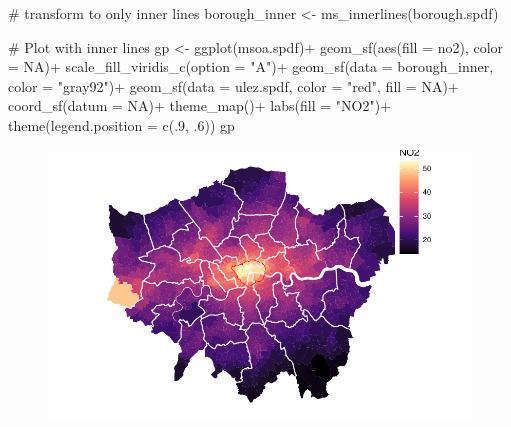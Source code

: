 \documentclass[
  letterpaper,
  DIV=11,
  numbers=noendperiod]{scrreprt}
\newenvironment{Shaded}{\begin{snugshade}}{\end{snugshade}}
\newcommand{\AttributeTok}[1]{\textcolor[rgb]{0.40,0.45,0.13}{#1}}
\newcommand{\CommentTok}[1]{\textcolor[rgb]{0.37,0.37,0.37}{#1}}
\newcommand{\ConstantTok}[1]{\textcolor[rgb]{0.56,0.35,0.01}{#1}}
\newcommand{\DecValTok}[1]{\textcolor[rgb]{0.68,0.00,0.00}{#1}}
\newcommand{\FunctionTok}[1]{\textcolor[rgb]{0.28,0.35,0.67}{#1}}
\newcommand{\NormalTok}[1]{\textcolor[rgb]{0.00,0.23,0.31}{#1}}
\newcommand{\OtherTok}[1]{\textcolor[rgb]{0.00,0.23,0.31}{#1}}
\newcommand{\SpecialCharTok}[1]{\textcolor[rgb]{0.37,0.37,0.37}{#1}}
\newcommand{\StringTok}[1]{\textcolor[rgb]{0.13,0.47,0.30}{#1}}
\begin{document}
\begin{Shaded}
\begin{Highlighting}[]
\CommentTok{\# transform to only inner lines}
\NormalTok{borough\_inner }\OtherTok{\textless{}{-}} \FunctionTok{ms\_innerlines}\NormalTok{(borough.spdf)}

\CommentTok{\# Plot with inner lines}
\NormalTok{gp }\OtherTok{\textless{}{-}} \FunctionTok{ggplot}\NormalTok{(msoa.spdf)}\SpecialCharTok{+}
    \FunctionTok{geom\_sf}\NormalTok{(}\FunctionTok{aes}\NormalTok{(}\AttributeTok{fill =}\NormalTok{ no2), }\AttributeTok{color =} \ConstantTok{NA}\NormalTok{)}\SpecialCharTok{+}
    \FunctionTok{scale\_fill\_viridis\_c}\NormalTok{(}\AttributeTok{option =} \StringTok{"A"}\NormalTok{)}\SpecialCharTok{+}
    \FunctionTok{geom\_sf}\NormalTok{(}\AttributeTok{data =}\NormalTok{ borough\_inner, }\AttributeTok{color =} \StringTok{"gray92"}\NormalTok{)}\SpecialCharTok{+}
    \FunctionTok{geom\_sf}\NormalTok{(}\AttributeTok{data =}\NormalTok{ ulez.spdf, }\AttributeTok{color =} \StringTok{"red"}\NormalTok{, }\AttributeTok{fill =} \ConstantTok{NA}\NormalTok{)}\SpecialCharTok{+}
    \FunctionTok{coord\_sf}\NormalTok{(}\AttributeTok{datum =} \ConstantTok{NA}\NormalTok{)}\SpecialCharTok{+}
    \FunctionTok{theme\_map}\NormalTok{()}\SpecialCharTok{+}
    \FunctionTok{labs}\NormalTok{(}\AttributeTok{fill =} \StringTok{"NO2"}\NormalTok{)}\SpecialCharTok{+}
    \FunctionTok{theme}\NormalTok{(}\AttributeTok{legend.position =} \FunctionTok{c}\NormalTok{(.}\DecValTok{9}\NormalTok{, .}\DecValTok{6}\NormalTok{))}
\NormalTok{gp}
\end{Highlighting}
\end{Shaded}

\begin{figure}[H]

{\centering \includegraphics{01_refresher_short_files/figure-pdf/unnamed-chunk-36-1.pdf}

}

\end{figure}
\end{document}
